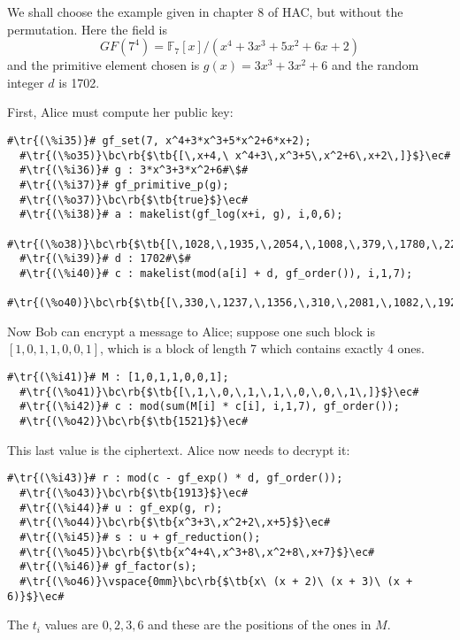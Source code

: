 \documentclass[a4paper,11pt,leqno,fleqn]{artikel3}
\newcommand{\bc}{\begin{center}}
\newcommand{\ec}{\end{center}}
\newcommand{\tr}[1]{\textcolor{red}{#1}}
\newcommand{\tb}[1]{\textcolor{blue}{#1}}
\newcommand{\rb}[1]{\raisebox{2mm}[0mm][1mm]{#1}}
\begin{document}
We shall choose the example given in chapter 8 of HAC, but without the
permutation.  Here the field is
\[
GF(7^4)=\mathbb{F}_7[x]/(x^4+3x^3+5x^2+6x+2)
\]
and the primitive element chosen is $g(x)=3x^3+3x^2+6$ and the random integer
$d$ is 1702.

First, Alice must compute her public key:

\vspace*{2mm}
\begin{lstlisting}[escapechar=\#]
  #\tr{(\%i35)}# gf_set(7, x^4+3*x^3+5*x^2+6*x+2);
  #\tr{(\%o35)}\bc\rb{$\tb{[\,x+4,\ x^4+3\,x^3+5\,x^2+6\,x+2\,]}$}\ec#
  #\tr{(\%i36)}# g : 3*x^3+3*x^2+6#\$#
  #\tr{(\%i37)}# gf_primitive_p(g);
  #\tr{(\%o37)}\bc\rb{$\tb{true}$}\ec#
  #\tr{(\%i38)}# a : makelist(gf_log(x+i, g), i,0,6);
  #\tr{(\%o38)}\bc\rb{$\tb{[\,1028,\,1935,\,2054,\,1008,\,379,\,1780,\,223\,]}$}\ec#
  #\tr{(\%i39)}# d : 1702#\$#
  #\tr{(\%i40)}# c : makelist(mod(a[i] + d, gf_order()), i,1,7);
  #\tr{(\%o40)}\bc\rb{$\tb{[\,330,\,1237,\,1356,\,310,\,2081,\,1082,\,1925\,]}$}\ec#
\end{lstlisting}

Now Bob can encrypt a message to Alice; suppose one such block is
$[1,0,1,1,0,0,1]$, which is a block of length 7 which contains exactly 4 ones.

\vspace*{2mm}
\begin{lstlisting}[escapechar=\#]
  #\tr{(\%i41)}# M : [1,0,1,1,0,0,1];
  #\tr{(\%o41)}\bc\rb{$\tb{[\,1,\,0,\,1,\,1,\,0,\,0,\,1\,]}$}\ec#
  #\tr{(\%i42)}# c : mod(sum(M[i] * c[i], i,1,7), gf_order());
  #\tr{(\%o42)}\bc\rb{$\tb{1521}$}\ec#
\end{lstlisting}

This last value is the ciphertext.  Alice now needs to decrypt it:

\vspace*{2mm}
\begin{lstlisting}[escapechar=\#]
  #\tr{(\%i43)}# r : mod(c - gf_exp() * d, gf_order());
  #\tr{(\%o43)}\bc\rb{$\tb{1913}$}\ec#
  #\tr{(\%i44)}# u : gf_exp(g, r);
  #\tr{(\%o44)}\bc\rb{$\tb{x^3+3\,x^2+2\,x+5}$}\ec#
  #\tr{(\%i45)}# s : u + gf_reduction();
  #\tr{(\%o45)}\bc\rb{$\tb{x^4+4\,x^3+8\,x^2+8\,x+7}$}\ec#
  #\tr{(\%i46)}# gf_factor(s);
  #\tr{(\%o46)}\vspace{0mm}\bc\rb{$\tb{x\ (x + 2)\ (x + 3)\ (x + 6)}$}\ec#
\end{lstlisting}

The $t_i$ values are $0,2,3,6$ and these are the positions of the ones in $M$.
\end{document}
